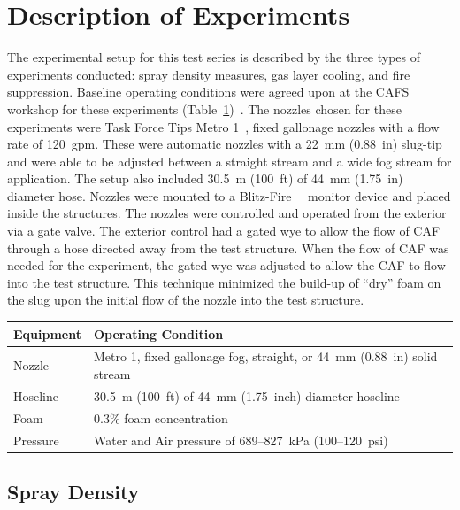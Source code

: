 \documentclass[12pt,oneside]{book}
\begin{document}
\section{Description of Experiments}
\label{sec:desc_experiments}
The experimental setup for this test series is described by the three types of experiments conducted: spray density measures, gas layer cooling, and fire suppression. Baseline operating conditions were agreed upon at the CAFS workshop for these experiments (Table~\ref{tab:op_condition})~\cite{Grant:2011}. The nozzles chosen for these experiments were Task Force Tips Metro 1~\textregistered, fixed gallonage nozzles with a flow rate of 120~gpm. These were automatic nozzles with a 22~mm (0.88~in) slug-tip and were able to be adjusted between a straight stream and a wide fog stream for application. The setup also included 30.5~m (100~ft) of 44~mm (1.75~in) diameter hose. Nozzles were mounted to a Blitz-Fire~\textregistered~ monitor device and placed inside the structures. The nozzles were controlled and operated from the exterior via a gate valve. The exterior control had a gated wye to allow the flow of CAF through a hose directed away from the test structure. When the flow of CAF was needed for the experiment, the gated wye was adjusted to allow the CAF to flow into the test structure. This technique minimized the build-up of ``dry'' foam on the slug upon the initial flow of the nozzle into the test structure.

\begin{table}[!ht]
\centering
{}\label{tab:op_condition}
\begin{tabular}{ll}
\toprule[1.5pt]
Equipment    &   Operating Condition \\
\midrule
Nozzle       & Metro 1, fixed gallonage fog, straight, or 44~mm (0.88~in) solid stream \\
Hoseline     & 30.5~m (100~ft) of 44~mm (1.75~inch) diameter hoseline \\
Foam         & 0.3\% foam concentration \\
Pressure     & Water and Air pressure of 689--827~kPa (100--120~psi) \\
\bottomrule[1.25pt]
\end{tabular}\par
\end{table}


\subsection{Spray Density}
\label{sec:desc_Spray_Density}
\end{document}
